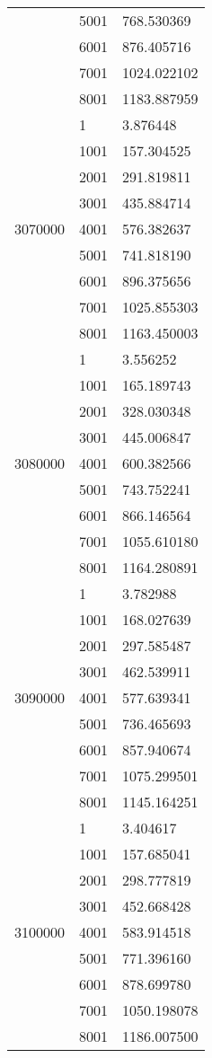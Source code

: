 \begin{table}[htb!]
\begin{tabular}{lll}
 & 5001 & 768.530369 \\
 & 6001 & 876.405716 \\
 & 7001 & 1024.022102 \\
 & 8001 & 1183.887959 \\
\multirow[c]{9}{*}{3070000} & 1 & 3.876448 \\
 & 1001 & 157.304525 \\
 & 2001 & 291.819811 \\
 & 3001 & 435.884714 \\
 & 4001 & 576.382637 \\
 & 5001 & 741.818190 \\
 & 6001 & 896.375656 \\
 & 7001 & 1025.855303 \\
 & 8001 & 1163.450003 \\
\multirow[c]{9}{*}{3080000} & 1 & 3.556252 \\
 & 1001 & 165.189743 \\
 & 2001 & 328.030348 \\
 & 3001 & 445.006847 \\
 & 4001 & 600.382566 \\
 & 5001 & 743.752241 \\
 & 6001 & 866.146564 \\
 & 7001 & 1055.610180 \\
 & 8001 & 1164.280891 \\
\multirow[c]{9}{*}{3090000} & 1 & 3.782988 \\
 & 1001 & 168.027639 \\
 & 2001 & 297.585487 \\
 & 3001 & 462.539911 \\
 & 4001 & 577.639341 \\
 & 5001 & 736.465693 \\
 & 6001 & 857.940674 \\
 & 7001 & 1075.299501 \\
 & 8001 & 1145.164251 \\
\multirow[c]{9}{*}{3100000} & 1 & 3.404617 \\
 & 1001 & 157.685041 \\
 & 2001 & 298.777819 \\
 & 3001 & 452.668428 \\
 & 4001 & 583.914518 \\
 & 5001 & 771.396160 \\
 & 6001 & 878.699780 \\
 & 7001 & 1050.198078 \\
 & 8001 & 1186.007500 \\

\end{tabular}
\end{table}
